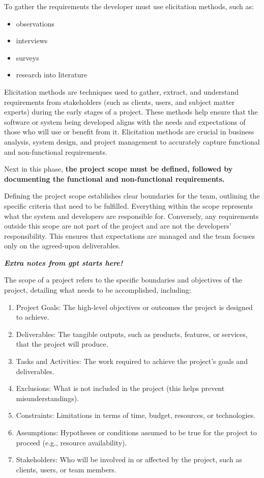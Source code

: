 \documentclass[a4paper]{article}
\begin{document}
To gather the requirements the developer must use elicitation methods, such as: 
\begin{itemize}
    \item observations
    \item interviews
    \item surveys
    \item research into literature
\end{itemize}    

Elicitation methods are techniques used to gather, extract, and understand requirements from stakeholders 
(such as clients, users, and subject matter experts) during the early stages of a project. These methods 
help ensure that the software or system being developed aligns with the needs and expectations of those who will use or benefit from it.
Elicitation methods are crucial in business analysis, system design, and project management to accurately capture functional and 
non-functional requirements.

Next in this phase, \textbf{the project scope must be defined, followed by documenting the functional and non-functional requirements.}

Defining the project scope establishes clear boundaries for the team, outlining the specific criteria that need to be fulfilled.
Everything within the scope represents what the system and developers are responsible for. Conversely, any requirements outside 
this scope are not part of the project and are not the developers' responsibility. This ensures that expectations are managed and the 
team focuses only on the agreed-upon deliverables.

\textbf{\textit{Extra notes from gpt starts here! }}

The scope of a project refers to the specific boundaries and objectives of the project, detailing what needs to be accomplished, including:

\begin{enumerate}
    \item Project Goals: The high-level objectives or outcomes the project is designed to achieve.
    \item Deliverables: The tangible outputs, such as products, features, or services, that the project will produce.
    \item Tasks and Activities: The work required to achieve the project's goals and deliverables.
    \item Exclusions: What is not included in the project (this helps prevent misunderstandings).
    \item Constraints: Limitations in terms of time, budget, resources, or technologies.
    \item Assumptions: Hypotheses or conditions assumed to be true for the project to proceed (e.g., resource availability).
    \item Stakeholders: Who will be involved in or affected by the project, such as clients, users, or team members.
\end {enumerate}
\end{document}
